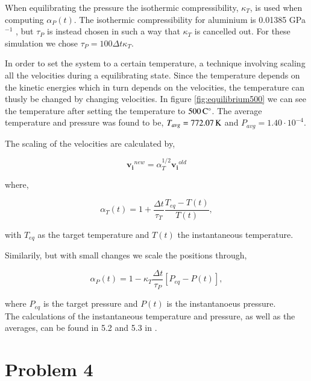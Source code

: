 When equilibrating the pressure the isothermic compressibility, $\kappa_T$, is used when computing $\alpha_P(t)$. The isothermic compressibility for aluminium is 0.01385 GPa$^{-1}$ \cite{knowledgedoor}, but $\tau_P$ is instead chosen in such a way that $\kappa_T$ is cancelled out. For these simulation we chose $\tau_P = 100\Delta t \kappa_T$.


In order to set the system to a certain temperature, a technique involving scaling all the velocities during a equilibrating state. Since the temperature depends on the kinetic energies which in turn depends on the velocities, the  temperature can thusly be changed by changing velocities. In figure \ref{fig:equilibrium500} we can see the temperature after setting the temperature to $\unit[500]{C^\circ}$. The average temperature and pressure was found to be, $T_{avg}=\unit[772.07]{K}$ and $P_{avg}=1.40\cdot 10^{-4}$.

The scaling of the velocities are calculated by,

\begin{equation}
\mathbf{v_i}^{new} = \alpha_T^{1/2}\mathbf{v_i}^{old}
\end{equation}

where,

\begin{equation}
\alpha_T(t) = 1+\frac{\Delta t}{\tau_T}\frac{T_{eq}-T(t)}{T(t)},
\end{equation}

with $T_{eq}$ as the target temperature and $T(t)$ the instantaneous temperature.

Similarily, but with small changes we scale the positions through,

\begin{equation}
\alpha_P(t)=1-\kappa_T\frac{\Delta t}{\tau_P}\left[P_{eq}-P(t)\right],
\end{equation}

where $P_{eq}$ is the target pressure and $P(t)$ is the instantanoeus pressure.\\

The calculations of the instantaneous temperature and pressure, as well as the averages, can be found in 5.2 and 5.3 in \cite{lecnotes}.

\section*{Problem 4}

